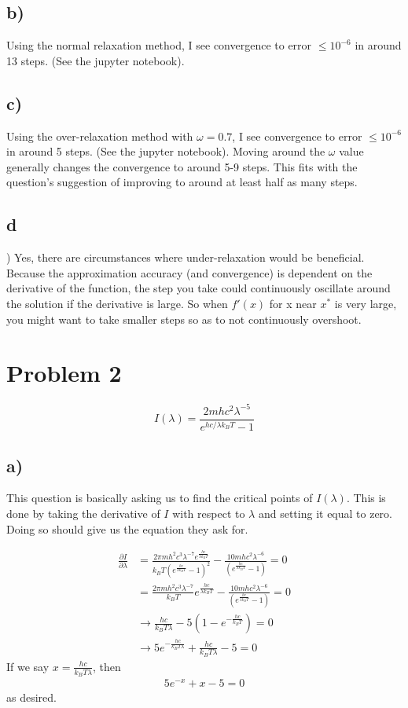\documentclass{article}
\begin{document}
\subsection*{b)}
Using the normal relaxation method, I see convergence to error $\leq 10^{-6}$ in around 13 steps. (See the jupyter notebook).

\subsection*{c)}
Using the over-relaxation method with $\omega = 0.7$, I see convergence to error $\leq 10^{-6}$ in around 5 steps. (See the jupyter notebook). Moving around the $\omega$ value generally changes the convergence to around 5-9 steps. This fits with the question's suggestion of improving to around at least half as many steps.

\subsection*{d})
Yes, there are circumstances where under-relaxation would be beneficial. Because the approximation accuracy (and convergence) is dependent on the derivative of the function, the step you take could continuously oscillate around the solution if the derivative is large. So when $f'(x)$ for x near $x^*$ is very large, you might want to take smaller steps so as to not continuously overshoot.

\section{Problem 2}
\begin{equation}
    I(\lambda) = \frac{2mhc^2 \lambda^{-5}}{e^{hc/\lambda k_B T} - 1}
\end{equation}

\subsection*{a)}

This question is basically asking us to find the critical points of $I(\lambda)$. This is done by taking the derivative of $I$ with respect to $\lambda$ and setting it equal to zero. Doing so should give us the equation they ask for.

\begin{align}
    \frac{\partial I}{\partial \lambda} &= \frac{2\pi m h^2 c^3 \lambda^{-7} e^{\frac{hc}{\lambda k_B T}}}{k_B T (e^{\frac{hc}{\lambda k_B T}} - 1)^2} - \frac{10 m h c^2 \lambda^{-6}}{(e^{\frac{hc}{\lambda k_B T}} - 1)} = 0 \\
     &= \frac{2\pi m h^2 c^3 \lambda^{-7}}{k_BT} e^{\frac{hc}{\lambda k_B T}} - \frac{10 m h c^2 \lambda^{-6}}{(e^{\frac{hc}{\lambda k_B T}} - 1)} = 0 \\
     &\rightarrow \frac{hc}{k_B T \lambda} - 5(1- e^{-\frac{hc}{k_B T}}) = 0 \\
     &\rightarrow 5e^{-\frac{hc}{k_B T \lambda}} + \frac{hc}{k_B T \lambda} - 5 = 0
\end{align}
If we say $x = \frac{hc}{k_B T \lambda}$, then 
\begin{align}
    5 e^{-x} + x - 5 = 0
\end{align}
as desired.
\end{document}

